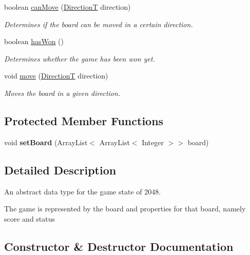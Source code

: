 \begin{DoxyCompactItemize}
boolean \hyperlink{classsrc_1_1BoardT_ac40c97bc9e022882e5120fb0195e80e2}{can\+Move} (\hyperlink{enumsrc_1_1DirectionT}{DirectionT} direction)
\begin{DoxyCompactList}\small\item\em Determines if the board can be moved in a certain direction. \end{DoxyCompactList}\item 
boolean \hyperlink{classsrc_1_1BoardT_aee8e1e801e17ee024328467079a7f26f}{has\+Won} ()
\begin{DoxyCompactList}\small\item\em Determines whether the game has been won yet. \end{DoxyCompactList}\item 
void \hyperlink{classsrc_1_1BoardT_a2b00baabe65a2ea417f9f5f7da212d5e}{move} (\hyperlink{enumsrc_1_1DirectionT}{DirectionT} direction)
\begin{DoxyCompactList}\small\item\em Moves the board in a given direction. \end{DoxyCompactList}\end{DoxyCompactItemize}
\subsection*{Protected Member Functions}
\begin{DoxyCompactItemize}
\item 
\mbox{\label{classsrc_1_1BoardT_aee89ac7deb5064de8b7ff4c08d20752c}} 
void {\bfseries set\+Board} (Array\+List$<$ Array\+List$<$ Integer $>$$>$ board)
\end{DoxyCompactItemize}


\subsection{Detailed Description}
An abstract data type for the game state of 2048. 

The game is represented by the board and properties for that board, namely score and status 

\subsection{Constructor \& Destructor Documentation}
\mbox{\label{classsrc_1_1BoardT_a9bf37b0ef9943d804da1647d251ea7ae}} 
